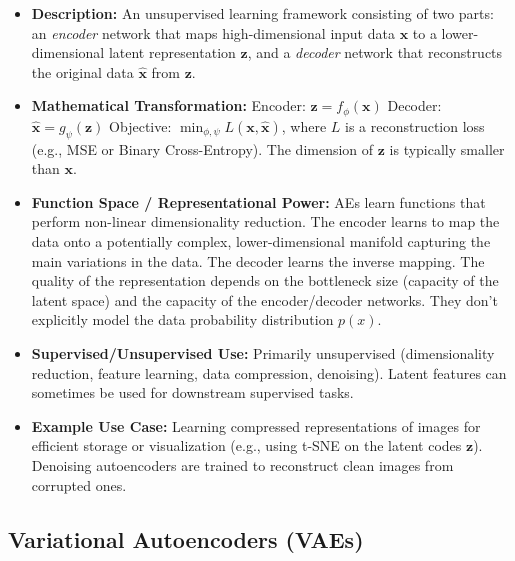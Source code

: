 \documentclass{article}
\newcommand{\bz}{\bm{z}}
\newcommand{\bx}{\bm{x}}
\begin{document}
\begin{itemize}
    \item \textbf{Description:} An unsupervised learning framework consisting of two parts: an \emph{encoder} network that maps high-dimensional input data $\bx$ to a lower-dimensional latent representation $\bz$, and a \emph{decoder} network that reconstructs the original data $\hat{\bx}$ from $\bz$.
    \item \textbf{Mathematical Transformation:}
        Encoder: $\bz = f_{\phi}(\bx)$
        Decoder: $\hat{\bx} = g_{\psi}(\bz)$
        Objective: $\min_{\phi, \psi} L(\bx, \hat{\bx})$, where $L$ is a reconstruction loss (e.g., MSE or Binary Cross-Entropy). The dimension of $\bz$ is typically smaller than $\bx$.
    \item \textbf{Function Space / Representational Power:} AEs learn functions that perform non-linear dimensionality reduction. The encoder learns to map the data onto a potentially complex, lower-dimensional manifold capturing the main variations in the data. The decoder learns the inverse mapping. The quality of the representation depends on the bottleneck size (capacity of the latent space) and the capacity of the encoder/decoder networks. They don't explicitly model the data probability distribution $p(x)$.
    \item \textbf{Supervised/Unsupervised Use:} Primarily unsupervised (dimensionality reduction, feature learning, data compression, denoising). Latent features can sometimes be used for downstream supervised tasks.
    \item \textbf{Example Use Case:} Learning compressed representations of images for efficient storage or visualization (e.g., using t-SNE on the latent codes $\bz$). Denoising autoencoders are trained to reconstruct clean images from corrupted ones.
\end{itemize}

\subsection{Variational Autoencoders (VAEs)}
\end{document}
